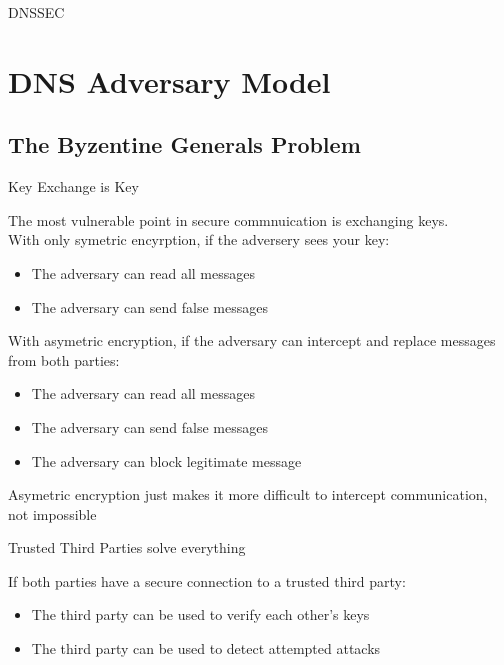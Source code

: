 \documentclass{beamer}
\begin{document}
\begin{frame}{DNSSEC}
\end{frame}

\section{DNS Adversary Model}

\subsection{The Byzentine Generals Problem}

\begin{frame}{Key Exchange is Key}

	The most vulnerable point in secure commnuication is exchanging keys.\\
	With only symetric encyrption, if the adversery sees your key:
	\begin{itemize}
		\item{The adversary can read all messages}
		\item{The adversary can send false messages}
	\end{itemize}
	With asymetric encryption, if the adversary can intercept and replace messages from both parties:
	\begin{itemize}
		\item{The adversary can read all messages}
		\item{The adversary can send false messages}
		\item{The adversary can block legitimate message}
	\end{itemize}
	Asymetric encryption just makes it more difficult to intercept communication, not impossible

\end{frame}

\begin{frame}{Trusted Third Parties solve everything}

	If both parties have a secure connection to a trusted third party:
	\begin{itemize}
		\item{The third party can be used to verify each other's keys}
		\item{The third party can be used to detect attempted attacks}
	\end{itemize}

\end{frame}
\end{document}
